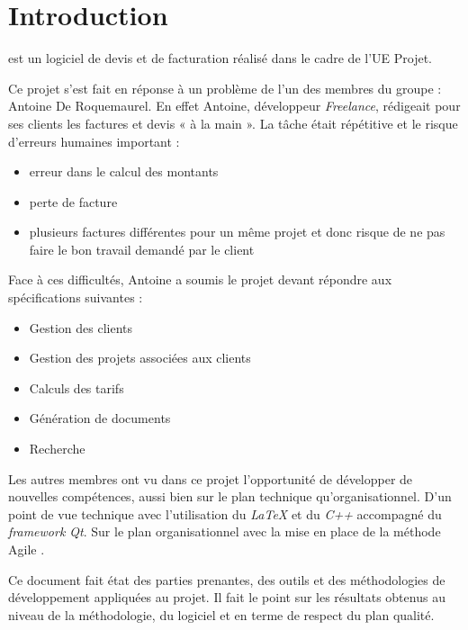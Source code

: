 \chapter*{Introduction}

\setlength{\parindent}{1cm}
\FactDev{}  est un logiciel de devis et de facturation réalisé dans le cadre de l’UE Projet. 

Ce projet s’est fait en réponse à un problème de l’un des membres du groupe : Antoine De Roquemaurel. En effet Antoine, développeur \textit{Freelance}, rédigeait pour ses clients les factures et devis « à la main ». La tâche était répétitive et le risque d’erreurs humaines important : 
\begin{itemize}
	\item erreur dans le calcul des montants
	\item perte de facture
	\item plusieurs factures différentes pour un même projet et donc risque de ne pas faire le bon travail demandé par le client
\end{itemize}

Face à ces difficultés, Antoine a soumis le projet devant répondre aux spécifications suivantes :
\begin{itemize}
	\item Gestion des clients
	\item Gestion des projets associées aux clients
	\item Calculs des tarifs
	\item Génération de documents
	\item Recherche
\end{itemize}


Les autres membres ont vu dans ce projet l'opportunité de développer de nouvelles compétences, aussi bien sur le plan technique qu'organisationnel. D'un point de vue technique avec l'utilisation du \textit{LaTeX} et du \textit{C++} accompagné du \textit{framework Qt}. Sur le plan organisationnel avec la mise en place de la méthode Agile \Scrum. 

Ce document fait état des parties prenantes, des outils et des méthodologies de développement appliquées au projet. Il fait le point sur les résultats obtenus au niveau de la méthodologie, du logiciel et en terme de respect du plan qualité. 